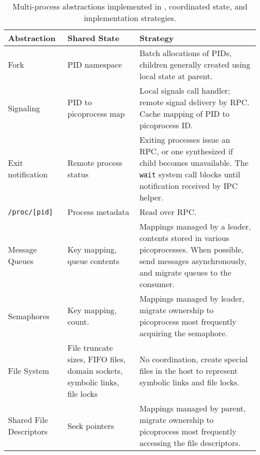 \begin{table}
\footnotesize
\centering
\begin{tabular}{|l|p{0.9in}|p{2.9in}|}
\hline
{\bf Ab\-strac\-tion} & {\bf Shared State} & {\bf Strategy} \\
\hline
Fork & 
\raggedright
PID namespace & Batch allocations of PIDs, children generally created using local state at parent.  \\
\hline
Signaling & PID to picoprocess map & Local signals call handler; remote signal delivery by RPC.  Cache mapping of PID to picoprocess ID. \\
\hline
\raggedright
Exit notification & 
\raggedright
Remote process status  & Exiting processes issue an RPC, or one synthesized if child becomes unavailable.  The {\tt wait} system call blocks until notification received by IPC helper. \\
\hline
{\tt /proc/[pid]} & Process metadata & Read over RPC.  \\
\hline
Message Queues & 
\raggedright
Key mapping, queue contents & Mappings managed by a leader, contents stored in various picoprocesses.  When possible, send messages asynchronously, and migrate queues to the consumer.\\
\hline
Semaphores & 
\raggedright
Key mapping, count. & Mappings managed by leader, migrate ownership to picoprocess most frequently acquiring the semaphore. \\
\hline
\raggedright
File System & 
\raggedright
File truncate sizes, FIFO files, domain sockets, symbolic links, file locks & No coordination, create special files in the host to represent symbolic links and file locks. \\
\hline
\raggedright
Shared File Descriptors & 
\raggedright
Seek pointers & Mappings managed by parent, migrate ownership to picoprocess most frequently accessing the file descriptors. \\
\hline
\end{tabular}
\caption{Multi-process abstractions implemented in \sysname{}, coordinated state, and implementation strategies.}
\label{tab:multiproc}
\end{table}




